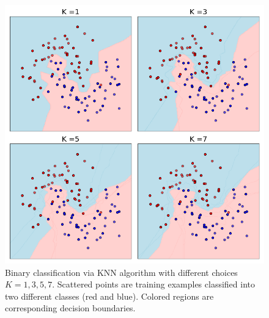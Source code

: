 \begin{refsection}
	
\begin{figure}[H]
	\centering
	\includegraphics[width=0.7\linewidth]{../codes/statisticalAnalysisLearning/KNN/KNNMoonShape}
	\caption{Binary classification via KNN algorithm with different choices $K = 1,3, 5, 7$. Scattered points are training examples classified into two different classes (red and blue). Colored regions are corresponding decision boundaries.}
	\label{ch:statistical-learning:KNN:fig:knnmoonshape}
\end{figure}
	
	
\end{refsection}













